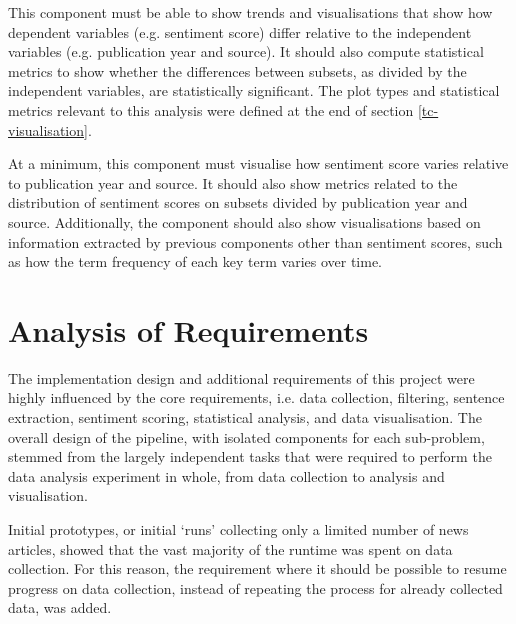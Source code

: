 \documentclass{report}
\begin{document}
This component must be able to show trends and visualisations that show how dependent variables (e.g. sentiment score) differ relative to the independent variables (e.g. publication year and source).
It should also compute statistical metrics to show whether the differences between subsets, as divided by the independent variables, are statistically significant.
The plot types and statistical metrics relevant to this analysis were defined at the end of section \ref{tc-visualisation}.

At a minimum, this component must visualise how sentiment score varies relative to publication year and source.
It should also show metrics related to the distribution of sentiment scores on subsets divided by publication year and source.
Additionally, the component should also show visualisations based on information extracted by previous components other than sentiment scores, such as how the term frequency of each key term varies over time.


\section{Analysis of Requirements} \label{Analysis of Requirements}

The implementation design and additional requirements of this project were highly influenced by the core requirements, i.e. data collection, filtering, sentence extraction, sentiment scoring, statistical analysis, and data visualisation.
The overall design of the pipeline, with isolated components for each sub-problem, stemmed from the largely independent tasks that were required to perform the data analysis experiment in whole, from data collection to analysis and visualisation.

Initial prototypes, or initial `runs' collecting only a limited number of news articles, showed that the vast majority of the runtime was spent on data collection.
For this reason, the requirement where it should be possible to resume progress on data collection, instead of repeating the process for already collected data, was added.
\end{document}
